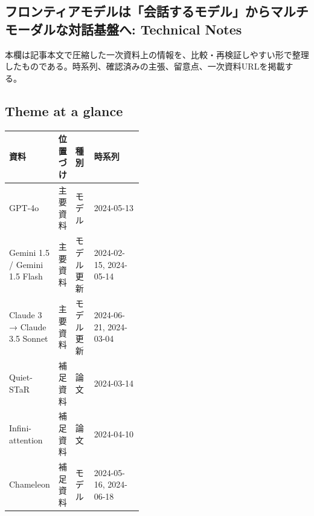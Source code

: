 \subsection*{フロンティアモデルは「会話するモデル」からマルチモーダルな対話基盤へ: Technical Notes}
本欄は記事本文で圧縮した一次資料上の情報を、比較・再検証しやすい形で整理したものである。時系列、確認済みの主張、留意点、一次資料URLを掲載する。
\smallskip
{}\par
\medskip
\subsection*{Theme at a glance}
\begin{center}
\footnotesize
\begin{tabularx}{\linewidth}{@{}p{0.20\linewidth}p{0.10\linewidth}p{0.14\linewidth}X@{}}
\toprule
資料 & 位置づけ & 種別 & 時系列 \\
\midrule
GPT-4o & 主要資料 & モデル & 2024-05-13     \\
Gemini 1.5 / Gemini 1.5 Flash & 主要資料 & モデル更新 & 2024-02-15, 2024-05-14     \\
Claude 3 → Claude 3.5 Sonnet & 主要資料 & モデル更新 & 2024-06-21, 2024-03-04     \\
Quiet-STaR & 補足資料 & 論文 & 2024-03-14     \\
Infini-attention & 補足資料 & 論文 & 2024-04-10     \\
Chameleon & 補足資料 & モデル & 2024-05-16, 2024-06-18     \\
\bottomrule
\end{tabularx}
\end{center}
\normalsize

